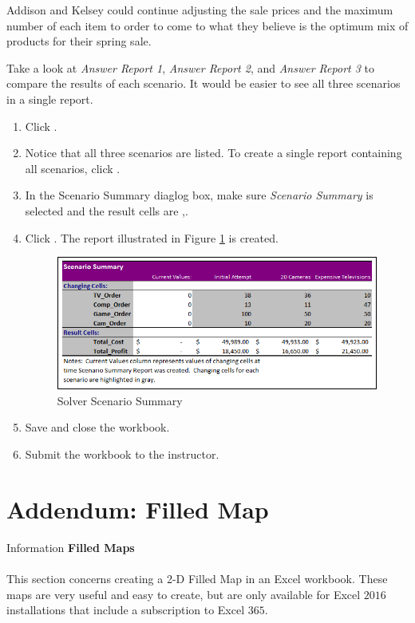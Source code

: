 Addison and Kelsey could continue adjusting the sale prices and the maximum number of each item to order to come to what they believe is the optimum mix of products for their spring sale.

Take a look at \textit{Answer Report 1}, \textit{Answer Report 2}, and \textit{Answer Report 3} to compare the results of each scenario. It would be easier to see all three scenarios in a single report.

\begin{enumerate}[resume]
	\item Click .
	\item Notice that all three scenarios are listed. To create a single report containing all scenarios, click .
	\item In the Scenario Summary diaglog box, make sure \textit{Scenario Summary} is selected and the result cells are ,.
	\item Click . The report illustrated in Figure \ref{08:fig83} is created.

	\begin{figure}[H]
		\centering
		\includegraphics[width=\maxwidth{.95\linewidth}]{gfx/ch08_fig83}
		\caption{Solver Scenario Summary}
		\label{08:fig83}
	\end{figure}

	\item Save and close the workbook.
	\item Submit the  workbook to the instructor.
\end{enumerate}

\section{Addendum: Filled Map}

\begin{center}
	\begin{infobox}{Information}
		\textbf{Filled Maps}
		\\
		\\
		This section concerns creating a 2-D Filled Map in an Excel workbook. These maps are very useful and easy to create, but are only available for Excel $ 2016 $ installations that include a subscription to Excel $ 365 $.
	\end{infobox}
\end{center}

